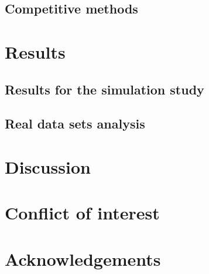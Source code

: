 \documentclass[11pt]{article}
\theoremstyle{plain}
\theoremstyle{definition}
\theoremstyle{remark}
\begin{document}
\subsection{Competitive methods}


\section{Results}

\subsection{Results for the simulation study}


\subsection{Real data sets analysis}


\section{Discussion}



\section{Conflict of interest}

\section{Acknowledgements}

\begin{thebibliography}{99}


\end{thebibliography}
\end{document}
